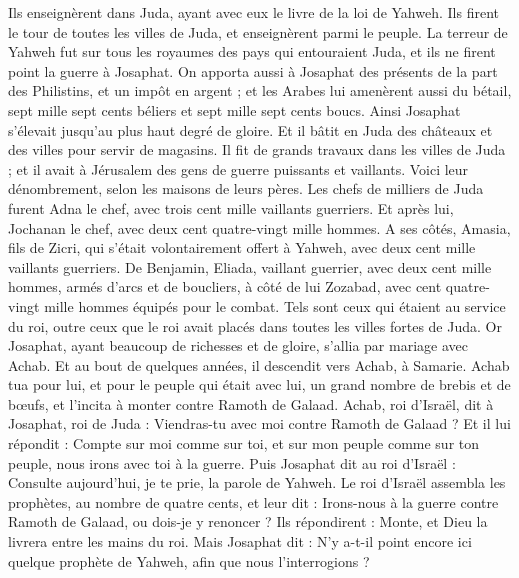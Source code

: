 \begin{multicols}{2}
Ils enseignèrent dans Juda, ayant avec eux le livre de la loi de Yahweh. Ils firent le tour de toutes les villes de Juda, et enseignèrent parmi le peuple.
La terreur de Yahweh fut sur tous les royaumes des pays qui entouraient Juda, et ils ne firent point la guerre à Josaphat.
On apporta aussi à Josaphat des présents de la part des Philistins, et un impôt en argent ; et les Arabes lui amenèrent aussi du bétail, sept mille sept cents béliers et sept mille sept cents boucs.
Ainsi Josaphat s'élevait jusqu'au plus haut degré de gloire. Et il bâtit en Juda des châteaux et des villes pour servir de magasins.
Il fit de grands travaux dans les villes de Juda ; et il avait à Jérusalem des gens de guerre puissants et vaillants.
Voici leur dénombrement, selon les maisons de leurs pères. Les chefs de milliers de Juda furent Adna le chef, avec trois cent mille vaillants guerriers.
Et après lui, Jochanan le chef, avec deux cent quatre-vingt mille hommes.
A ses côtés, Amasia, fils de Zicri, qui s'était volontairement offert à Yahweh, avec deux cent mille vaillants guerriers.
De Benjamin, Eliada, vaillant guerrier, avec deux cent mille hommes, armés d'arcs et de boucliers,
à côté de lui Zozabad, avec cent quatre-vingt mille hommes équipés pour le combat.
Tels sont ceux qui étaient au service du roi, outre ceux que le roi avait placés dans toutes les villes fortes de Juda.
\VerseOne{}Or Josaphat, ayant beaucoup de richesses et de gloire, s'allia par mariage avec Achab.
Et au bout de quelques années, il descendit vers Achab, à Samarie. Achab tua pour lui, et pour le peuple qui était avec lui, un grand nombre de brebis et de bœufs, et l'incita à monter contre Ramoth de Galaad.
Achab, roi d'Israël, dit à Josaphat, roi de Juda : Viendras-tu avec moi contre Ramoth de Galaad ? Et il lui répondit : Compte sur moi comme sur toi, et sur mon peuple comme sur ton peuple, nous irons avec toi à la guerre.
Puis Josaphat dit au roi d'Israël : Consulte aujourd'hui, je te prie, la parole de Yahweh.
Le roi d'Israël assembla les prophètes, au nombre de quatre cents, et leur dit : Irons-nous à la guerre contre Ramoth de Galaad, ou dois-je y renoncer ? Ils répondirent : Monte, et Dieu la livrera entre les mains du roi.
Mais Josaphat dit : N'y a-t-il point encore ici quelque prophète de Yahweh, afin que nous l'interrogions ?

\end{multicols}
